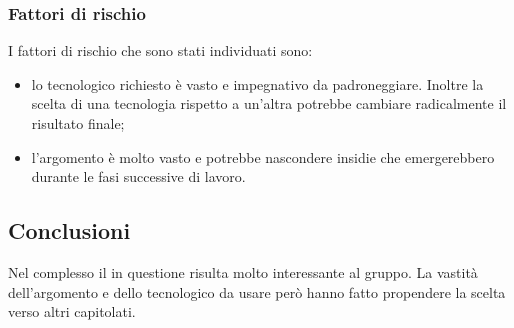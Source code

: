 \documentclass[../StudioDiFattibilita.tex]{subfiles}
\begin{document}
			\subsubsection{Fattori di rischio}
			I fattori di rischio che sono stati individuati sono:
			\begin{itemize}
				\item lo  tecnologico richiesto è vasto e impegnativo da padroneggiare. Inoltre la scelta di una tecnologia rispetto a un'altra potrebbe cambiare radicalmente il risultato finale;
				\item l'argomento è molto vasto e potrebbe nascondere insidie che emergerebbero durante le fasi successive di lavoro.
			\end{itemize}
			\subsection{Conclusioni}
				Nel complesso il  in questione risulta molto interessante al gruppo. La vastità dell'argomento e dello  tecnologico da usare però hanno fatto propendere la scelta verso altri capitolati.
\end{document}
